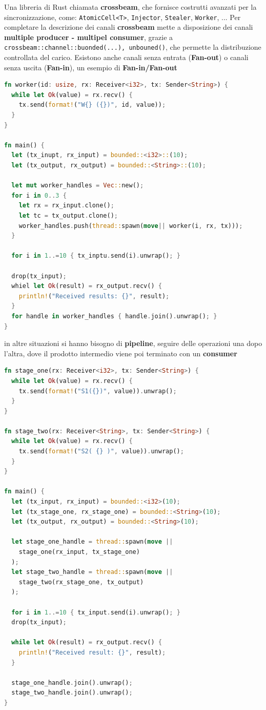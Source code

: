 \documentclass[12pt]{article}
\begin{document}
Una libreria di Rust chiamata \textbf{crossbeam}, che fornisce costrutti avanzati per la sincronizzazione, come: \texttt{AtomicCell<T>}, \texttt{Injector}, \texttt{Stealer}, \texttt{Worker}, ... Per completare la descrizione dei canali \textbf{crossbeam} mette a disposizione dei canali \textbf{multiple producer - multipel consumer}, grazie a \texttt{crossbeam::channel::{buonded(...), unbouned()}}, che permette la distribuzione controllata del carico. Esistono anche canali senza entrata (\textbf{Fan-out}) o canali senza uscita (\textbf{Fan-in}), un esempio di \textbf{Fan-in/Fan-out}
\begin{lstlisting}[language=rust]
fn worker(id: usize, rx: Receiver<i32>, tx: Sender<String>) {
  while let Ok(value) = rx.recv() {
    tx.send(format!("W{} ({})", id, value));
  }
}

fn main() {
  let (tx_inupt, rx_input) = bounded::<i32>::(10);
  let (tx_output, rx_output) = bounded::<String>::(10);

  let mut worker_handles = Vec::new();
  for i in 0..3 {
    let rx = rx_input.clone();
    let tc = tx_output.clone();
    worker_handles.push(thread::spawn(move|| worker(i, rx, tx)));
  }

  for i in 1..=10 { tx_inptu.send(i).unwrap(); }

  drop(tx_input);
  whiel let Ok(result) = rx_output.recv() {
    println!("Received results: {}", result);
  }
  for handle in worker_handles { handle.join().unwrap(); }
}
\end{lstlisting}
in altre situazioni si hanno bisogno di \textbf{pipeline}, seguire delle operazioni una dopo l'altra, dove il prodotto intermedio viene poi terminato con un \textbf{consumer}
\begin{lstlisting}[language=rust]
fn stage_one(rx: Receiver<i32>, tx: Sender<String>) {
  while let Ok(value) = rx.recv() {
    tx.send(format!("S1({})", value)).unwrap();
  }
}

fn stage_two(rx: Receiver<String>, tx: Sender<String>) {
  while let Ok(value) = rx.recv() {
    tx.send(format!("S2( {} )", value)).unwrap();
  }
}

fn main() {
  let (tx_input, rx_input) = bounded::<i32>(10);
  let (tx_stage_one, rx_stage_one) = bounded::<String>(10);
  let (tx_output, rx_output) = bounded::<String>(10);

  let stage_one_handle = thread::spawn(move ||
    stage_one(rx_input, tx_stage_one)
  );
  let stage_two_handle = thread::spawn(move || 
    stage_two(rx_stage_one, tx_output)
  );

  for i in 1..=10 { tx_input.send(i).unwrap(); }
  drop(tx_input);

  while let Ok(result) = rx_output.recv() { 
    println!("Received result: {}", result); 
  }
  
  stage_one_handle.join().unwrap();
  stage_two_handle.join().unwrap();
}
\end{lstlisting}
\end{document}
